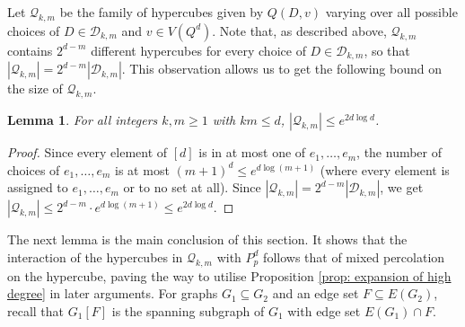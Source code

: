 \documentclass{article}
\newtheorem{lemma}[thm]{Lemma}
\theoremstyle{definition}
\newcommand{\cD}{\mathcal{D}}
\newcommand{\cQ}{\mathcal{Q}}
\begin{document}
Let $\cQ_{k,m}$ be the family of hypercubes given by $Q(D,v)$ varying over all possible choices of $D\in \cD_{k,m}$ and $v\in V(Q^d)$. Note that, as described above, $\cQ_{k,m}$ contains $2^{d-m}$ different hypercubes for every choice of $D\in\cD_{k,m}$, so that $|\cQ_{k,m}|=2^{d-m}|\cD_{k,m}|$. This observation allows us to get the following bound on the size of $\cQ_{k,m}$.
\begin{lemma}\label{lem: size of Qkm}
For all integers $k,m\ge 1$ with $km\le d$, $|\cQ_{k,m}|\leq e^{2d\log d}$.
\end{lemma}
\begin{proof}
Since every element of $[d]$ is in at most one of $e_1,\ldots, e_m$, the number of choices of $e_1,\ldots, e_m$ is at most $(m+1)^d\le e^{d\log(m+1)}$ (where every element is assigned to $e_1,\ldots,e_m$ or to no set at all).
Since $|\cQ_{k,m}|=2^{d-m}|\cD_{k,m}|$, we get $|\cQ_{k,m}|\leq 2^{d-m}\cdot e^{d\log (m+1)}\leq e^{2d\log d}$. 
\end{proof}

The next lemma is the main conclusion of this section. 
It shows that the interaction of the hypercubes in $\cQ_{k,m}$ with $P^d_p$ follows that of mixed percolation on the hypercube, paving the way to utilise Proposition \ref{prop: expansion of high degree} in later arguments. For graphs $G_1\subseteq G_2$ and an edge set $F\subseteq E(G_2)$, recall that $G_1[F]$ is the spanning subgraph of $G_1$ with edge set $E(G_1)\cap F$.
\end{document}

